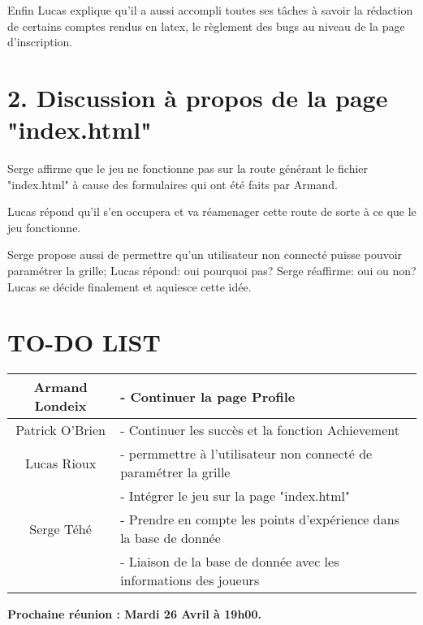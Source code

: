 Enfin Lucas explique qu'il a aussi accompli toutes ses tâches à savoir la rédaction de certains comptes rendus en latex, le règlement des bugs au niveau de la page d'inscription.


\section*{2. Discussion à propos de la page "index.html"}

Serge affirme que le jeu ne fonctionne pas sur la route générant le fichier "index.html" à cause des formulaires qui ont été faits par Armand.

Lucas répond qu'il s'en occupera et va réamenager cette route de sorte à ce que le jeu fonctionne. 

Serge propose aussi de permettre qu'un utilisateur non connecté puisse pouvoir paramétrer la grille; Lucas répond: oui pourquoi pas? Serge réaffirme: oui ou non? Lucas se décide finalement et aquiesce cette idée.




\section*{TO-DO LIST}

\begin{center}
\begin{tabular}{|c|l|}
    \hline
    Armand Londeix & - Continuer la page Profile \\
    \hline
    Patrick O'Brien 
    & - Continuer les succès et la fonction Achievement \\
    \hline
    Lucas Rioux & - permmettre à l'utilisateur non connecté de paramétrer la grille \\
    & - Intégrer le jeu sur la page "index.html" \\
    \hline
    Serge Téhé & - Prendre en compte les points d'expérience dans la base de donnée \\
    & - Liaison de la base de donnée avec 
    les informations des joueurs  \\
    \hline
\end{tabular}
\end{center}

\tabto{0cm}\textbf{Prochaine réunion : Mardi 26 Avril à 19h00.}